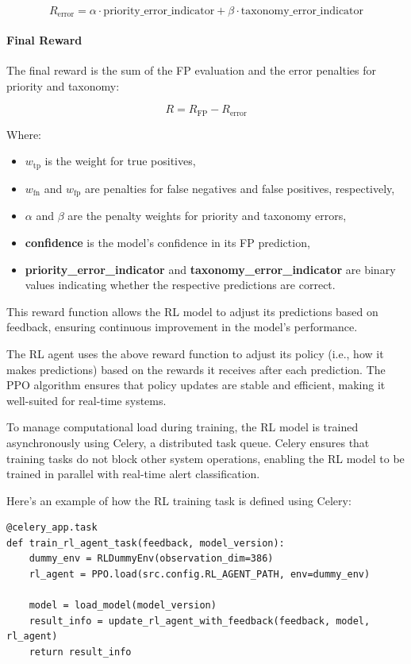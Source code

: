 \[
R_{\text{error}} = \alpha \cdot \text{priority\_error\_indicator} + \beta \cdot \text{taxonomy\_error\_indicator}
\label{eq:error_penalty}
\]

\paragraph{Final Reward}
The final reward is the sum of the FP evaluation and the error penalties for priority and taxonomy:

\[
R = R_{\text{FP}} - R_{\text{error}}
\label{eq:final_reward}
\]

Where:
\begin{itemize}
    \item \( w_{\text{tp}} \) is the weight for true positives,
    \item \( w_{\text{fn}} \) and \( w_{\text{fp}} \) are penalties for false negatives and false positives, respectively,
    \item \( \alpha \) and \( \beta \) are the penalty weights for priority and taxonomy errors,
    \item \textbf{confidence} is the model’s confidence in its FP prediction,
    \item \textbf{priority\_error\_indicator} and \textbf{taxonomy\_error\_indicator} are binary values indicating whether the respective predictions are correct.
\end{itemize}

This reward function allows the RL model to adjust its predictions based on feedback, ensuring continuous improvement in the model's performance.

The RL agent uses the above reward function to adjust its policy (i.e., how it makes predictions) based on the rewards it receives after each prediction. 
The PPO algorithm ensures that policy updates are stable and efficient, making it well-suited for real-time systems.

To manage computational load during training, the RL model is trained asynchronously using Celery, a distributed task queue. 
Celery ensures that training tasks do not block other system operations, enabling the RL model to be trained in parallel with real-time alert classification.

Here's an example of how the RL training task is defined using Celery:

\vspace{0.2cm}
\noindent
\begin{minipage}{\linewidth}
\begin{verbatim}
@celery_app.task
def train_rl_agent_task(feedback, model_version):
    dummy_env = RLDummyEnv(observation_dim=386)
    rl_agent = PPO.load(src.config.RL_AGENT_PATH, env=dummy_env)

    model = load_model(model_version)
    result_info = update_rl_agent_with_feedback(feedback, model, rl_agent)
    return result_info
\end{verbatim}
\label{lst:rl_training_task}
\end{minipage}
\vspace{0.1cm}

